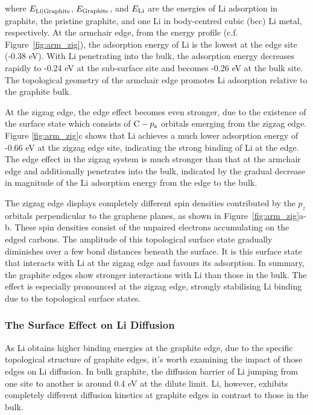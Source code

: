 \documentclass[../main.tex]{subfiles}
\begin{document}
where $E_{\rm{Li|Graphite}}$, $E_{\rm{Graphite}}$, and $E_{\rm{Li}}$ are the energies of Li adsorption in graphite, the pristine graphite, and one Li in body-centred cubic (bcc) Li metal, respectively. At the armchair edge, from the energy profile (c.f. Figure~\ref{fig:arm_zig}), the adsorption energy of Li is the lowest at the edge site (-0.38 eV). With Li penetrating into the bulk, the adsorption energy decreases rapidly to -0.24 eV at the sub-surface site and becomes -0.26 eV at the bulk site. The topological geometry of the armchair edge promotes Li adsorption relative to the graphite bulk.

At the zigzag edge, the edge effect becomes even stronger, due to the existence of the surface state which consists of ${\rm{C}}-p_{\rm{z}}$ orbitals emerging from the zigzag edge.\cite{fujita1996peculiar,lee2005magnetic} Figure \ref{fig:arm_zig}c shows that Li achieves a much lower adsorption energy of -0.66 eV at the zigzag edge site, indicating the strong binding of Li at the edge. The edge effect in the zigzag system is much stronger than that at the armchair edge and additionally penetrates into the bulk, indicated by the gradual decrease in magnitude of the Li adsorption energy from the edge to the bulk. 

The zigzag edge displays completely different spin densities contributed by the $p_z$ orbitals perpendicular to the graphene planes, as shown in Figure~\ref{fig:arm_zig}a-b. \cite{leggesse2016lithium,fujita1996peculiar,lee2005magnetic,peng2020lithium} These spin densities consist of the unpaired electrons accumulating on the edged carbons. The amplitude of this topological surface state gradually diminishes over a few bond distances beneath the surface. It is this surface state that interacts with Li at the zigzag edge and favours its adsorption. In summary, the graphite edges show stronger interactions with Li than those in the bulk. The effect is especially pronounced at the zigzag edge, strongly stabilising Li binding due to the topological surface states.
    
\subsubsection{The Surface Effect on Li Diffusion}
As Li obtains higher binding energies at the graphite edge, due to the specific topological structure of graphite edges,\cite{leggesse2016lithium,peng2020lithium} it's worth examining the impact of those edges on Li diffusion. In bulk graphite, the diffusion barrier of Li jumping from one site to another is around 0.4 eV at the dilute limit.\cite{thinius2014theoretical} Li, however, exhibits completely different diffusion kinetics at graphite edges in contrast to those in the bulk.\cite{leggesse2016lithium,peng2020lithium} 
\end{document}
